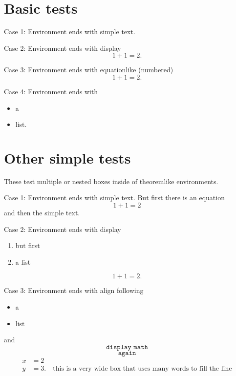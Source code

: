 \documentclass[leqno]{article}
\begin{document}
\section{Basic tests}
\begin{theorem}
  Case 1: Environment ends with simple text.
\end{theorem}
\begin{theorem}
  Case 2: Environment ends with display
  \[
    1 + 1 = 2.
  \]
\end{theorem}
\begin{theorem}
  Case 3: Environment ends with equationlike (numbered)
  \begin{equation}
    1 + 1 = 2.
  \end{equation}
\end{theorem}
\begin{theorem}
  Case 4: Environment ends with
  \begin{itemize}
  \item a
  \item list.
  \end{itemize}
\end{theorem}



\section{Other simple tests}

These test multiple or nested boxes inside of theoremlike environments.

\begin{remark}
  Case 1: Environment ends with simple text.
  But first there is an equation
  \begin{equation}
    1+1 = 2
  \end{equation}
  and then the simple text.
\end{remark}
\begin{remark}
  Case 2: Environment ends with display
  \begin{enumerate}
  \item but first
  \item a list
  \end{enumerate}
  \[
    1 + 1 = 2.
  \]
\end{remark}
\begin{remark}
  Case 3: Environment ends with align
  following
  \begin{itemize}
  \item a
  \item list
  \end{itemize}
  and
  \[
    \texttt{ display math }
  \]
  \[
    \texttt{ again }
  \]
  \begin{align}
    x & = 2\\
    y & = 3. \quad \text{this is a very wide box that uses many words to fill the line}
  \end{align}
\end{remark}
\end{document}
